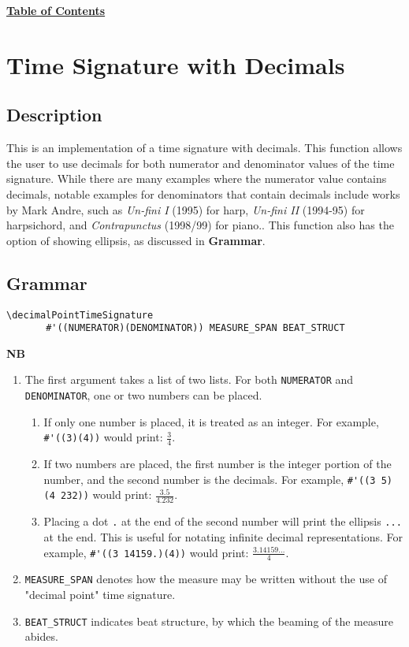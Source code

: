\hyperref[sec:toc]{\textbf{Table of Contents}}

\vfill \break





\section {Time Signature with Decimals}

\hfill
{}
\hfill

\subsection{Description}
This is an implementation of a time signature with decimals. This function allows the user to use decimals for both numerator and denominator values of the time signature. While there are many examples where the numerator value contains decimals, notable examples for denominators that contain decimals include works by Mark Andre, such as \textit{Un-fini I} (1995) for harp,\autocite{RN1755} \textit{Un-fini II} (1994-95) for harpsichord,\autocite{RN1754} and \textit{Contrapunctus} (1998/99) for piano.\autocite{RN1753}. This function also has the option of showing ellipsis, as discussed in \textbf{Grammar}. 
\subsection{Grammar}
\begin{verbatim}
\decimalPointTimeSignature
       #'((NUMERATOR)(DENOMINATOR)) MEASURE_SPAN BEAT_STRUCT
\end{verbatim}
\textbf{NB}
\begin{enumerate}
\item The first argument takes a list of two lists. For both \verb|NUMERATOR| and \verb|DENOMINATOR|, one or two numbers can be placed.
\begin{enumerate}
\item If only one number is placed, it is treated as an integer. For example, \verb|#'((3)(4))| would print: \(\frac{3}{4}\).
\item If two numbers are placed, the first number is the integer portion of the number, and the second number is the decimals. For example, \verb|#'((3 5)(4 232))| would print: \(\frac{3.5}{4.232}\). 
\item Placing a dot \verb|.| at the end of the second number will print the ellipsis \verb|...| at the end. This is useful for notating infinite decimal representations. For example, \verb|#'((3 14159.)(4))| would print: \(\frac{3.14159...}{4}\).
\end{enumerate}
\item \verb|MEASURE_SPAN| denotes how the measure may be written without the use of "decimal point" time signature. 
\item \verb |BEAT_STRUCT| indicates beat structure, by which the beaming of the measure abides.

\end{enumerate}

